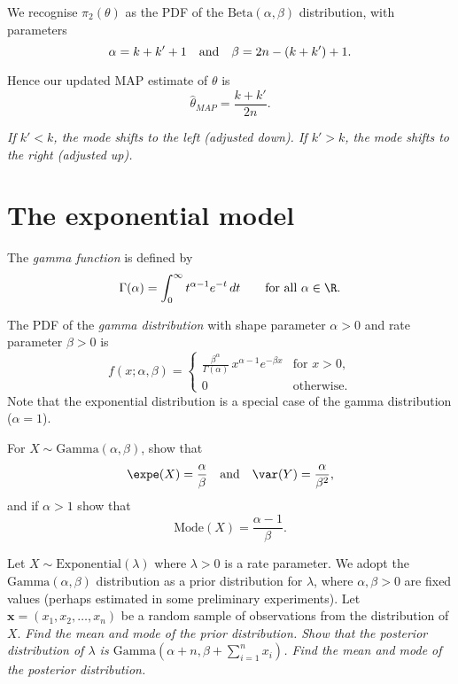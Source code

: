 \begin{solution}
\vspace*{1ex}
We recognise $\pi_2(\theta)$ as the PDF of the $\text{Beta}(\alpha,\beta)$ distribution, with parameters 
\[
\alpha=k+k'+1 \text{\quad and\quad}\beta=2n-(k+k')+1.
\]

Hence our updated MAP estimate of $\theta$ is
\[
\hat{\theta}_{MAP} = \frac{k+k'}{2n}.
\]

\vspace*{-1.5ex}
\bit
\it If $k'<k$, the mode shifts to the left (adjusted down).
\it If $k'>k$, the mode shifts to the right (adjusted up).
\eit
\een
\end{solution}


\section{The exponential model}
The \emph{gamma function} is defined by
\[
\Gamma(\alpha) = \int_0^{\infty} t^{\alpha-1}e^{-t}\,dt \text{\qquad for all $\alpha\in\R$.}
\]

The PDF of the \emph{gamma distribution} with shape parameter $\alpha>0$ and rate parameter $\beta>0$ is
\[
f(x;\alpha,\beta) = \left\{\begin{array}{ll}
	\displaystyle\frac{ \beta^{\alpha}}{\Gamma(\alpha)}\, x^{\alpha-1} e^{-\beta x} & \text{for $x>0$}, \\
	0												& \text{otherwise.}
\end{array}\right.
\]
Note that the exponential distribution is a special case of the gamma distribution ($\alpha=1$).

\begin{exercise}
For $X\sim\text{Gamma}(\alpha,\beta)$, show that
\[
\expe(X) = \frac{\alpha}{\beta} \text{\quad and\quad} \var(Y) = \frac{\alpha}{\beta^2},
\]
and if $\alpha > 1$ show that
\[
\text{Mode}(X) = \frac{\alpha-1}{\beta}.
\]
\end{exercise}


\begin{example}
Let $X\sim\text{Exponential}(\lambda)$ where $\lambda>0$ is a rate parameter. We adopt the $\text{Gamma}(\alpha,\beta)$ distribution as a prior distribution for $\lambda$, where $\alpha,\beta>0$ are fixed values (perhaps estimated in some preliminary experiments). Let $\mathbf{x}=(x_1,x_2,\ldots,x_n)$ be a random sample of observations from the distribution of $X$.
\ben
\it Find the mean and mode of the prior distribution.
\it Show that the posterior distribution of $\lambda$ is $\text{Gamma}(\alpha+n,\beta+\sum_{i=1}^n x_i)$.
\it Find the mean and mode of the posterior distribution.
\een
\end{example}

